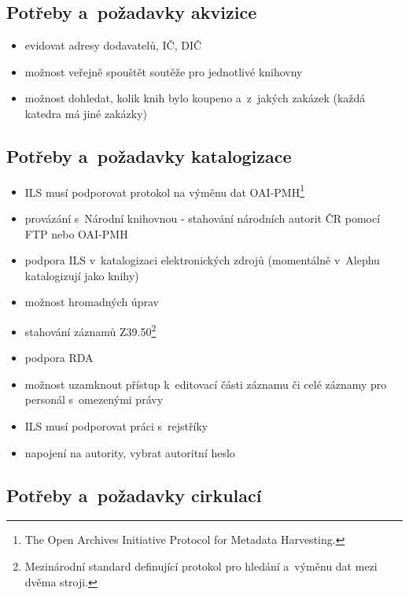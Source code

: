 \documentclass[
	11pt, oneside, printed, final, palatino, monochrome
	microtype,
	table,   %
	lof,     %
	lot     %
]{fithesis3}
\begin{document}
{\subsection{Potřeby a~požadavky akvizice}

\begin{itemize}
\item evidovat adresy dodavatelů, IČ, DIČ
\item možnost veřejně spouštět soutěže pro jednotlivé knihovny
\item možnost dohledat, kolik knih bylo koupeno a~z~jakých zakázek (každá katedra má jiné zakázky)
\end{itemize}

\subsection{Potřeby a~požadavky katalogizace}

\begin{itemize}
\item ILS musí podporovat protokol na výměnu dat OAI-PMH\footnote{The Open Archives Initiative Protocol for Metadata Harvesting.}
\item provázání s~Národní knihovnou - stahování národních autorit ČR pomocí FTP nebo OAI-PMH
\item podpora ILS v~katalogizaci elektronických zdrojů (momentálně v~Alephu katalogizují jako knihy)
\item možnost hromadných úprav
\item stahování záznamů Z39.50\footnote{Mezinárodní standard definující protokol pro hledání a~výměnu dat mezi dvěma stroji.}
\item podpora RDA
\item možnost uzamknout přístup k~editovací části záznamu či celé záznamy pro personál s~omezenými právy
\item ILS musí podporovat práci s~rejstříky
\item napojení na autority, vybrat autoritní heslo
\end{itemize}

\subsection{Potřeby a~požadavky cirkulací}

}
\end{document}

